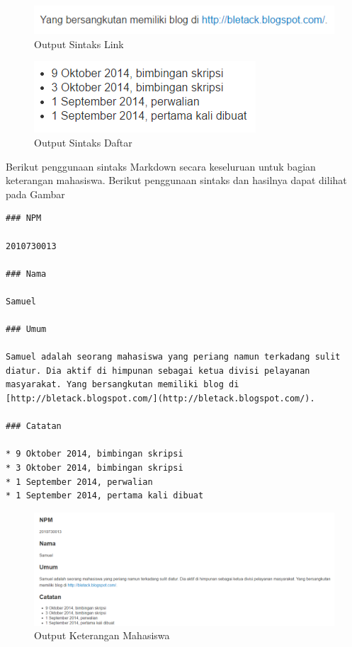 \begin{figure}[H]
\centering
\includegraphics[scale=1]{Gambar/link.png}
\caption[Output Sintaks Link]{Output Sintaks Link} 
\label{fig:link}
\end{figure}

\begin{figure}[H]
\centering
\includegraphics[scale=1]{Gambar/daftar.png}
\caption[Output Sintaks Daftar]{Output Sintaks Daftar} 
\label{fig:daftar}
\end{figure}

Berikut penggunaan sintaks Markdown secara keseluruan untuk bagian keterangan mahasiswa. Berikut penggunaan sintaks dan hasilnya dapat dilihat pada Gambar
\begin{lstlisting}
### NPM

2010730013

### Nama

Samuel
			
### Umum
			
Samuel adalah seorang mahasiswa yang periang namun terkadang sulit diatur. Dia aktif di himpunan sebagai ketua divisi pelayanan masyarakat. Yang bersangkutan memiliki blog di [http://bletack.blogspot.com/](http://bletack.blogspot.com/).
			
### Catatan
			
* 9 Oktober 2014, bimbingan skripsi
* 3 Oktober 2014, bimbingan skripsi
* 1 September 2014, perwalian
* 1 September 2014, pertama kali dibuat
\end{lstlisting}

\begin{figure}[H]
\centering
\includegraphics[scale=0.5]{Gambar/overall.png}
\caption[Output Keterangan Mahasiswa]{Output Keterangan Mahasiswa} 
\label{fig:overall}
\end{figure}

